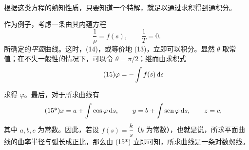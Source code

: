 根据这类方程的熟知性质，只要知道一个特解，就足以通过求积得到通积分。

作为例子，考虑一条由其内蕴方程
\[
\frac{1}{\rho}=f(s),\qquad \frac{1}{T}=0.
\]
所确定的\emph{平面}曲线。这时，(14)，或等价地 (13)，立即可以积分。显然 \(\theta\) 取常值；在不失一般性的情况下，可以令 \(\theta=\pi/2\)；继而由求积式
\begin{equation}\tag{15}
\varphi=-\int f(s)\,\mathrm{d} s
\end{equation}


\noindent 求得 \(\varphi\)。最后，对于所求曲线有
\begin{equation}\tag{15*}
x=a+\int \cos\varphi\,\mathrm{d} s,\qquad y=b+\int \operatorname{sen}\varphi\,\mathrm{d} s,\qquad z=c,
\end{equation}
其中 \(a,b,c\) 为常数。因此，若设 \(f(s)=\dfrac{k}{s}\)（\(k\) 为常数），也就是说，所求平面曲线的曲率半径与弧长成正比，那么由 (15*) 立即可知，所求曲线是一条对数螺线。
